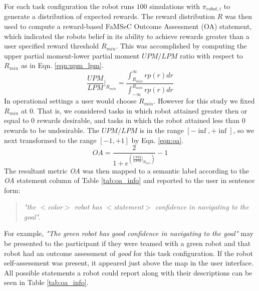 \documentclass[aaai]{article}
\begin{document}
For each task configuration the robot runs $100$ simulations with $\pi_{robot, i}$ to generate a distribution of expected rewards. The reward distribution $R$ was then used to compute a reward-based FaMSeC Outcome Assessment (OA) statement, which indicated the robots belief in its ability to achieve rewards greater than a user specified reward threshold $R_{min}$. This was accomplished by computing the upper partial moment-lower partial moment $UPM/LPM$ ratio with respect to $R_{min}$ as in Eqn. \ref{eqn:upm_lpm}.
\begin{equation}
\frac{\textit{UPM}}{\textit{LPM}}|_{R_{min}} = \frac{\int_{R_{min}}^\infty r p(r) dr}{\int_{-\infty}^{R_{min}} r p(r) dr}
\label{eqn:upm_lpm}
\end{equation}
In operational settings a user would choose $R_{min}$. However for this study we fixed $R_{min}$ at $0$. That is, we considered tasks in which robot attained greater then or equal to $0$ rewards desirable, and tasks in which the robot attained less than $0$ rewards to be undesirable. The $UPM/LPM$ is in the range $[-\inf, +\inf]$, so we next transformed to the range $[-1,+1]$ by Eqn. \ref{eqn:oa}.
\begin{equation}
\textit{OA} = \frac{2}{1+e^{\left(\frac{\textit{UPM}}{\textit{LPM}}|_{R_{min}}\right)}} - 1
\label{eqn:oa}
\end{equation}
The resultant metric \textit{OA} was then mapped to a semantic label according to the \textit{OA} statement column of Table \ref{tab:oa_info} and reported to the user in sentence form:
\begin{quote}
\emph{"the $<$color$>$ robot has $<$statement$>$ confidence in navigating to the goal"}.
\end{quote}
For example, \emph{"The green robot has good confidence in navigating to the goal"} may be presented to the participant if they were teamed with a green robot and that robot had an outcome assessment of \textit{good} for this task configuration. If the robot self-assessment was present, it appeared just above the map in the user interface. All possible statements a robot could report along with their descriptions can be seen in Table \ref{tab:oa_info}.
\end{document}
